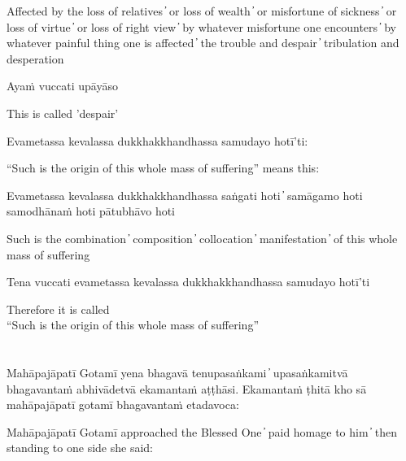 \begin{cprenglish}
Affected by the loss of relatives  ̓  or loss of wealth  ̓  or misfortune of sickness  ̓  or loss of virtue  ̓  or loss of right view  ̓  by whatever misfortune one encounters  ̓  by whatever painful thing one is affected  ̓  the trouble and despair  ̓  tribulation and desperation
\end{cprenglish}

Ayaṁ vuccati upāyāso

\begin{cprenglish}
This is called 'despair'
\end{cprenglish}

Evametassa kevalassa dukkhakkhandhassa samudayo hotī’ti:

\begin{cprenglish}
“Such is the origin of this whole mass of suffering” means this:
\end{cprenglish}

Evametassa kevalassa dukkhakkhandhassa saṅgati hoti  ̓  samāgamo hoti samodhānaṁ hoti pātubhāvo hoti

\begin{cprenglish}
Such is the combination  ̓  composition  ̓  collocation  ̓  manifestation  ̓  of this whole mass of suffering
\end{cprenglish}

Tena vuccati evametassa kevalassa dukkhakkhandhassa samudayo hotī’ti

\begin{cprenglish}
Therefore it is called\\
“Such is the origin of this whole mass of suffering”
\end{cprenglish}


\clearpage

\section*{}
\paliTitle{}

\begin{leader}
\end{leader}

Mahāpajāpatī Gotamī yena bhagavā tenupasaṅkami  ̓  upasaṅkamitvā bhagavantaṁ abhivādetvā ekamantaṁ aṭṭhāsi. Ekamantaṁ ṭhitā kho sā mahāpajāpatī gotamī bhagavantaṁ etadavoca:

\begin{cprenglish}
Mahāpajāpatī Gotamī approached the Blessed One  ̓  paid homage to him  ̓  then standing to one side she said:
\end{cprenglish}

